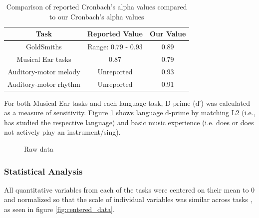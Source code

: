 \documentclass[a4paper]{article}
\begin{document}
\begin{table}[ht]
\centering
\begin{tabular}{|c|c|c|}
\hline
\textbf{Task} & \textbf{Reported Value} & \textbf{Our Value} \\
\hline
GoldSmiths \cite{Müllensiefen_Gingras_Musil_Stewart_2014} & Range: 0.79 - 0.93 & 0.89 \\
Musical Ear tasks \cite{Wallentin_Nielsen_Friis-Olivarius_Vuust_Vuust_2010}& 0.87 & 0.79 \\
Auditory-motor melody \cite{Kachlicka_Saito_Tierney_2019}& Unreported & 0.93 \\
Auditory-motor rhythm\cite{Kachlicka_Saito_Tierney_2019}& Unreported & 0.91 \\
\hline
\end{tabular}
\caption{Comparison of reported Cronbach's alpha values compared to our Cronbach's alpha values}
\label{tab:comparison}
\end{table}

For both Musical Ear tasks and each language task,  D-prime (d′) was calculated as a measure of sensitivity\cite{Macmillan_Creelman_2004}. Figure \ref{fig:dprime} shows language d-prime by matching L2 (i.e., has studied the respective language) and basic music experience (i.e. does or does not actively play an instrument/sing). 

\begin{figure}[t]
  \centering
  \caption{Raw data}
  \label{fig:dprime}
\end{figure}

\subsubsection{Statistical Analysis}


All quantitative variables from each of the tasks were centered on their mean to 0 and normalized so that the scale of individual variables was similar across tasks , as seen in figure \ref{fig:centered_data}.
\end{document}
